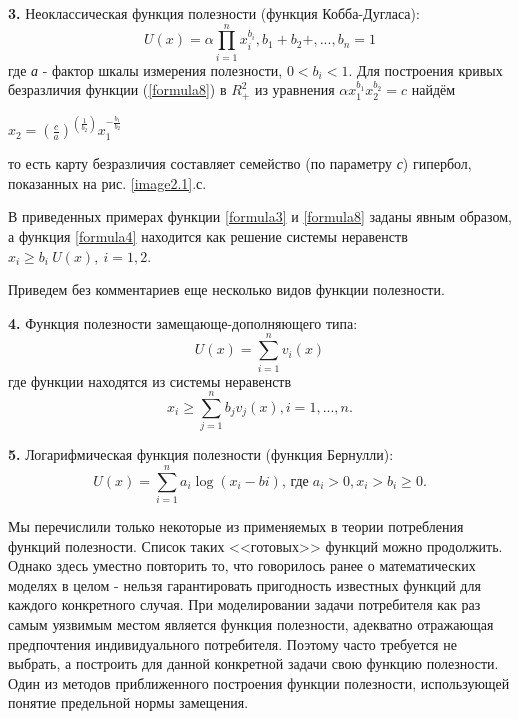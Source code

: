 \documentclass[12pt, 4paper]{book}
\begin{document}
{\par
\textbf{3.} Неоклассическая функция полезности (функция Кобба-Дугласа):
\begin{equation}
\label{formula8}
U(x)=\alpha\prod\limits_{i=1}^{n}x_{i}^{b_{i}},b_{1}+b_{2}+,...,b_{n}=1
\end{equation}
где \textit{а} - фактор шкалы измерения полезности, $0<b_{i}<1$. Для построения кривых безразличия функции (\ref{formula8}) в $R_{+}^{2}$ из уравнения $\alpha x_{1}^{b_{1}}x_{2}^{b_{2}}=c$ найдём 

\begin{center}
$x_{2}=\left(\frac{c}{a}\right)^{\left(\frac{1}{b_{2}}\right)}x_{1}^{-\frac{b_{1}}{b_{2}}}$
\end{center}
то есть карту безразличия составляет семейство (по параметру \textit{с}) гипербол, показанных на рис. \ref{image2.1}.с. 
\par
В приведенных примерах функции \ref{formula3} и \ref{formula8} заданы явным образом, а функция \ref{formula4} находится как решение системы неравенств 
$x_{i} \geq b_{i} \: U(x), \: i = 1,2$.
\par
Приведем без комментариев еще несколько видов функции полезности.
\par

\textbf{4.} Функция полезности замещающе-дополняющего типа:
\begin{equation}
\label{formula9}
U(x)=\sum\limits_{i=1}^{n}v_{i}(x)
\end{equation}
где функции находятся из системы неравенств 
\begin{equation}
\label{formula10}
x_{i}\geq \sum\limits_{j=1}^{n}b_{j}v_{j}(x) ,i=1,...,n.
\end{equation}

\par
\textbf{5.} Логарифмическая функция полезности (функция Бернулли):
\begin{equation}
\label{formula11}
U(x)=\sum\limits_{i=1}^{n}a_{i}\log(x_{i}-b{i})
\text{, где} \; a_{i} > 0, x_{i}>b_{i}\geq 0.
\end{equation}

\par
Мы перечислили только некоторые из применяемых в теории потребления функций полезности. Список таких <<готовых>> функций можно продолжить. Однако здесь уместно повторить то, что говорилось ранее о математических моделях в целом - нельзя гарантировать пригодность известных функций для каждого конкретного случая. При моделировании задачи потребителя как раз самым уязвимым местом является функция полезности, адекватно отражающая предпочтения индивидуального потребителя. Поэтому часто требуется не выбрать, а построить для данной конкретной задачи свою функцию полезности. Один из методов приближенного построения функции полезности, использующей понятие предельной нормы замещения.
\par
\begin{center}

\end{center}}
\end{document}
